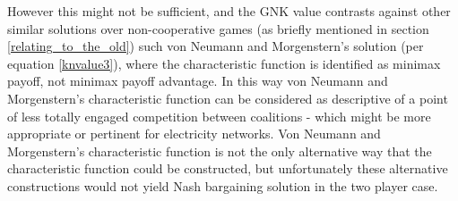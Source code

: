However this might not be sufficient, and the GNK value contrasts against other similar solutions over non-cooperative games (as briefly mentioned in section \ref{relating_to_the_old}) such von Neumann and Morgenstern's solution (per equation \ref{knvalue3}), where the characteristic function is identified as minimax payoff, not minimax payoff advantage.
In this way von Neumann and Morgenstern's characteristic function can be considered as descriptive of a point of less totally engaged competition between coalitions - which might be more appropriate or pertinent for electricity networks.
Von Neumann and Morgenstern's characteristic function is not the only alternative way that the characteristic function could be constructed, but unfortunately these alternative constructions would not \DIFdelbegin {}\DIFdelend \DIFaddbegin {}\DIFaddend yield Nash bargaining solution in the two player case.








